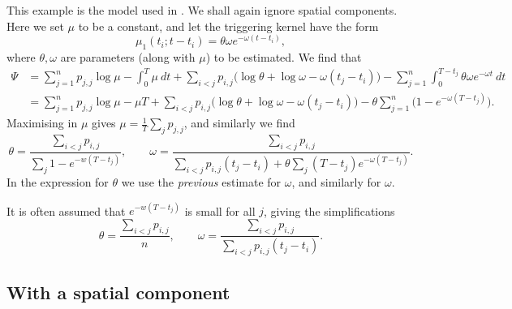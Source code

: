 \documentclass[twoside,a4paper]{article}
\theoremstyle{plain}
\theoremstyle{definition}
\begin{document}
This example is the model used in \cite[Section~2]{lm}.
We shall again ignore spatial components.
Here we set $\mu$ to be a constant, and let the triggering kernel have the form
\[ \mu_1(t_i; t - t_i) = \theta \omega e^{-\omega(t-t_i)}, \]
where $\theta, \omega$ are parameters (along with $\mu$) to be estimated.
We find that
\begin{align*} \Psi &= \sum_{j=1}^n p_{j,j} \log\mu - \int_0^T \mu \ dt
+ \sum_{i<j} p_{i,j} \big( \log\theta + \log\omega - \omega(t_j-t_i) \big)
- \sum_{j=1}^n \int_0^{T-t_j} \theta \omega e^{-\omega t} \ dt \\
&= \sum_{j=1}^n p_{j,j} \log\mu - \mu T
+ \sum_{i<j} p_{i,j} \big( \log\theta + \log\omega - \omega(t_j-t_i) \big)
- \theta \sum_{j=1}^n \big(1 - e^{-\omega (T-t_j)}\big).
\end{align*}
Maximising in $\mu$ gives $\mu = \frac{1}{T} \sum_j p_{j,j}$, and similarly we find
\[ \theta = \frac{\sum_{i<j} p_{i,j}}{\sum_j 1 - e^{-w(T-t_j)}}, \qquad
\omega = \frac{\sum_{i<j} p_{i,j}}{\sum_{i<j} p_{i,j} (t_j-t_i) + \theta\sum_j (T-t_j)e^{-\omega(T-t_j)}}. \]
In the expression for $\theta$ we use the \emph{previous} estimate for $\omega$, and similarly
for $\omega$.

It is often assumed that $e^{-w(T-t_j)}$ is small for all $j$, giving the simplifications
\[ \theta = \frac{\sum_{i<j} p_{i,j}}{n}, \qquad
\omega = \frac{\sum_{i<j} p_{i,j}}{\sum_{i<j} p_{i,j} (t_j-t_i)}. \]



\subsection{With a spatial component}\label{app:grid_model_em}
\end{document}

